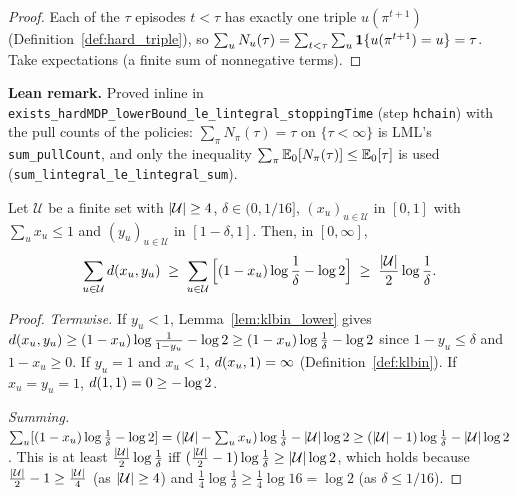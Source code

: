 \begin{proof}
\leanok
{}
Each of the $\tau$ episodes $t < \tau$ has exactly one triple $u(\pi^{t+1})$
(Definition~\ref{def:hard_triple}), so $\sum_u N_u(\tau) = \sum_{t<\tau}\sum_u\mathbf{1}\{u(\pi^{t+1}) = u\} = \tau$.
Take expectations (a finite sum of nonnegative terms).
\end{proof}

\textbf{Lean remark.} Proved inline in \texttt{exists\_hardMDP\_lowerBound\_le\_lintegral\_stoppingTime}
(step \texttt{hchain}) with the pull counts of the policies: $\sum_\pi N_\pi(\tau) = \tau$ on
$\{\tau < \infty\}$ is LML's \texttt{sum\_pullCount}, and only the inequality
$\sum_\pi \mathbb{E}_0[N_\pi(\tau)] \le \mathbb{E}_0[\tau]$ is used (\texttt{sum\_lintegral\_le\_lintegral\_sum}).

\begin{lemma}\label{lem:hard_count_lower}
\leanok
Let $\mathcal U$ be a finite set with $\lvert \mathcal U \rvert \ge 4$, $\delta \in (0, 1/16]$,
$(x_u)_{u \in \mathcal U}$ in $[0,1]$ with $\sum_u x_u \le 1$ and $(y_u)_{u \in \mathcal U}$ in
$[1 - \delta, 1]$. Then, in $[0, \infty]$,
\[
  \sum_{u \in \mathcal U}d(x_u, y_u) \;\ge\; \sum_{u \in \mathcal U}\Big[(1 - x_u)\log\frac1\delta - \log 2\Big] \;\ge\; \frac{\lvert \mathcal U \rvert}{2}\log\frac1\delta .
\]
\end{lemma}

\begin{proof}
\leanok
{}
\emph{Termwise.} If $y_u < 1$, Lemma~\ref{lem:klbin_lower} gives
$d(x_u,y_u) \ge (1-x_u)\log\frac{1}{1-y_u} - \log 2 \ge (1-x_u)\log\frac1\delta - \log 2$
since $1 - y_u \le \delta$ and $1 - x_u \ge 0$. If $y_u = 1$ and $x_u < 1$, $d(x_u, 1) = \infty$
(Definition~\ref{def:klbin}). If $x_u = y_u = 1$, $d(1,1) = 0 \ge -\log 2$.

\emph{Summing.} $\sum_u[(1-x_u)\log\frac1\delta - \log 2] = (\lvert \mathcal U \rvert - \sum_u x_u)\log\frac1\delta - \lvert \mathcal U \rvert\log 2
\ge (\lvert \mathcal U \rvert - 1)\log\frac1\delta - \lvert \mathcal U \rvert\log 2$. This is at least
$\frac{\lvert \mathcal U \rvert}{2}\log\frac1\delta$ iff $(\frac{\lvert \mathcal U \rvert}{2} - 1)\log\frac1\delta \ge \lvert \mathcal U \rvert\log 2$,
which holds because $\frac{\lvert \mathcal U \rvert}{2} - 1 \ge \frac{\lvert \mathcal U \rvert}{4}$ (as
$\lvert \mathcal U \rvert \ge 4$) and $\frac14\log\frac1\delta \ge \frac14\log 16 = \log 2$ (as $\delta \le 1/16$).
\end{proof}

